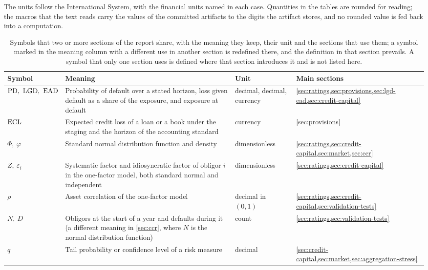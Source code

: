 The units follow the International System, with the financial units named in each case. Quantities in the tables are rounded for reading; the macros that the text
reads carry the values of the committed artifacts to the digits the artifact stores, and no rounded value is fed back into a computation.

\begin{table}[htbp]
\centering
\footnotesize
\setlength{\tabcolsep}{4pt}
\caption{Symbols that two or more sections of the report share, with the meaning they keep, their unit and the sections that use them; a symbol marked in the meaning column with a different use in another section is redefined there, and the definition in that section prevails. A symbol that only one section uses is defined where that section introduces it and is not listed here.}
\label{tab:notation}
\begin{tabularx}{\textwidth}{>{\raggedright\arraybackslash}p{2.6cm}>{\raggedright\arraybackslash}X>{\raggedright\arraybackslash}p{2.7cm}>{\raggedright\arraybackslash}p{2.9cm}}
\toprule
Symbol & Meaning & Unit & Main sections \\
\midrule
$\PD,\ \LGD,\ \EAD$ & Probability of default over a stated horizon, loss given default as a share of the exposure, and exposure at default & decimal, decimal, currency & \cref{sec:ratings,sec:provisions,sec:lgd-ead,sec:credit-capital} \\
$\mathrm{ECL}$ & Expected credit loss of a loan or a book under the staging and the horizon of the accounting standard & currency & \cref{sec:provisions} \\
$\Phi,\ \varphi$ & Standard normal distribution function and density & dimensionless & \cref{sec:ratings,sec:credit-capital,sec:market,sec:ccr} \\
$Z,\ \varepsilon_i$ & Systematic factor and idiosyncratic factor of obligor $i$ in the one-factor model, both standard normal and independent & dimensionless & \cref{sec:ratings,sec:credit-capital} \\
$\rho$ & Asset correlation of the one-factor model & decimal in $(0,1)$ & \cref{sec:ratings,sec:credit-capital,sec:validation-tests} \\
$N,\ D$ & Obligors at the start of a year and defaults during it (a different meaning in \cref{sec:ccr}, where $N$ is the normal distribution function) & count & \cref{sec:ratings,sec:validation-tests} \\
$q$ & Tail probability or confidence level of a risk measure & decimal & \cref{sec:credit-capital,sec:market,sec:aggregation-stress} \\

\end{tabularx}
\end{table}
